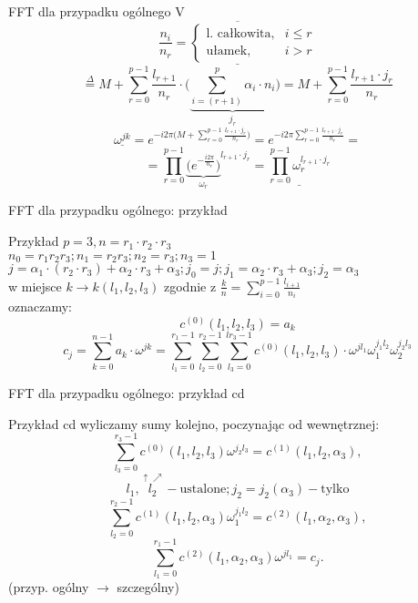 \begin{frame}{FFT dla przypadku ogólnego V}
	\[
		\underline{\overline{\frac{n_i}{n_r} = 
		\begin{cases}
			\text{l. całkowita}, & i \leq r \\
			\text{ułamek}, & i > r
		\end{cases}}}
	\]
	\[
		\stackrel{\Delta}{=} M + \sum\limits_{r = 0}^{p-1} \frac{l_{r+1}}{n_r} \cdot \Bigg( \underbrace{\sum\limits_{i = (r+1)}^{p} \alpha_i \cdot n_i}_{j_r} \Bigg) = M +  \sum\limits_{r = 0}^{p-1} \frac{l_{r+1} \cdot j_r}{n_r}
	\]
	\[
		\underline{\omega^{jk}} = e^{-i2\pi \bigg( M +  \sum\limits_{r = 0}^{p-1} \frac{l_{r+1} \cdot j_r}{n_r} \bigg)} = e^{-i2\pi \sum\limits_{r = 0}^{p-1} \frac{l_{r+1} \cdot j_r}{n_r}} =
	\]
	\[
		= \prod\limits_{r = 0}^{p-1} {\underbrace{\bigg( e^{-\frac{i2\pi}{n_r}} \bigg)}_{\omega_r}}^{l_{r+1} \cdot j_r} = \underline{\prod\limits_{r = 0}^{p-1} \omega_r^{l_{r+1} \cdot j_r}}
	\]
\end{frame}
\begin{frame}{FFT dla przypadku ogólnego: przykład}
	\begin{exampleblock}{Przykład}
	$p = 3, n = r_1 \cdot r_2 \cdot r_3$ \\
	$n_0 = r_1r_2r_3 ; n_1 = r_2r_3 ; n_2 = r_3 ; n_3 = 1$ \\
	$j = \alpha_1 \cdot (r_2 \cdot r_3) + \alpha_2 \cdot r_3 + \alpha_3 ; j_0 = j ; j_1 = \alpha_2  \cdot r_3 + \alpha_3 ; j_2 = \alpha_3$ \\
	w miejsce $k \to k(l_1, l_2, l_3)$ zgodnie z $\frac{k}{n} = \sum\limits_{i = 0}^{p-1} \frac{l_{i+1}}{n_i}$ \\
	oznaczamy:
	\[
		c^{(0)}(l_1, l_2, l_3) = a_k
	\]
	\[
		c_j = \sum\limits_{k = 0}^{n-1} a_k \cdot \omega^{jk} = \sum\limits_{l_1 = 0}^{r_1 - 1} \sum\limits_{l_2 = 0}^{r_2 - 1} \sum\limits_{l_3 = 0}^{lr_3 - 1} c^{(0)}(l_1, l_2, l_3) \cdot \omega^{jl_1} \omega_1^{j_1l_2} \omega_2^{j_2l_3}
	\]
	\end{exampleblock}
\end{frame}
\begin{frame}{FFT dla przypadku ogólnego: przykład cd}
	\begin{exampleblock}{Przykład cd}
	wyliczamy sumy kolejno, poczynając od wewnętrznej:
	\[
		\sum\limits_{l_3 = 0}^{r_3 - 1} c^{(0)}(l_1, l_2, l_3) \omega^{j_2l_3} = c^{(1)}(l_1, l_2,\alpha_3),
	\]
	\[
		l_1, \stackrel{\uparrow\nearrow}{l_2} - \text{ustalone} ; j_2 = j_2(\alpha_3) - \text{tylko}
	\]
	\[
		\sum\limits_{l_2 = 0}^{r_2 - 1} c^{(1)}(l_1, l_2, \alpha_3)\omega_1^{j_1l_2} = c^{(2)}(l_1,\alpha_2,\alpha_3),
	\] 
	\[
		\sum\limits_{l_1 = 0}^{r_1 - 1} c^{(2)}(l_1, \alpha_2, \alpha_3) \omega^{jl_1} = c_j.
	\]
	(przyp. ogólny $\to$ szczególny)
	\end{exampleblock}
\end{frame}